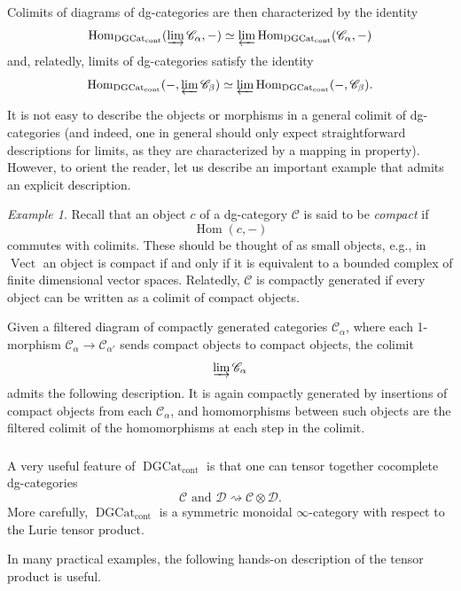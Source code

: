 \documentclass[10pt]{amsart}
\newcommand{\udHom}{\on{Hom}_{\DGCat}}
\newcommand{\on}{\operatorname}
\newcommand{\Vect}{\on{Vect}}
\theoremstyle{remark}
\newtheorem{ex}[subsubsection]{Example}
\newcommand{\Hom}{\operatorname{Hom}}
\newcommand{\sD}{\mathscr{D}}
\numberwithin{equation}{section}
\newcommand{\sC}{\mathscr{C}}
\newcommand{\msf}{\operatorname}
\newcommand{\DGCat}{\msf{DGCat}_{\on{cont}}}
\begin{document}
Colimits of diagrams of dg-categories are then characterized by the identity 
%
\[
\udHom(\varinjlim \sC_\alpha, -) \simeq \varprojlim 
\udHom(\sC_\alpha, -)
\]
%
and, relatedly, limits of dg-categories satisfy the identity 
%
\[
 \udHom(-, \varprojlim \sC_\beta) \simeq \varprojlim 
 \udHom(-, \sC_\beta).
\]
%

It is not easy to describe the objects or morphisms in a general colimit of 
dg-categories (and indeed, one in general should only expect straightforward 
descriptions for limits, as they are characterized by a mapping in 
property). However, to orient the reader, let us describe an important example 
that admits an explicit description. 


\begin{ex}\label{e:colimitcats}Recall that an object $c$ of a dg-category $\sC$ 
is said to be {\em 
compact} if $$\Hom(c, -)$$ commutes with colimits. These should be thought of 
as 
small objects, e.g., in $\Vect$ an object is compact if and only if it is 
equivalent to a bounded complex of finite dimensional vector spaces. Relatedly, 
$\sC$ is compactly generated if every object can be written as a colimit of 
compact objects. 

Given a filtered diagram of compactly generated categories $\sC_\alpha$, where 
each 1-morphism $\sC_\alpha \rightarrow \sC_{\alpha'}$ sends compact objects to 
compact objects, the colimit 
%
\[
  \varinjlim \sC_{\alpha}
\]
%
admits the following description. It is again compactly generated by insertions 
of compact objects from each $\sC_{\alpha}$, and homomorphisms between such 
objects are the filtered colimit of the homomorphisms at each step in the 
colimit. 
\end{ex}



\subsubsection{}A very useful feature of $\DGCat$ is that one can tensor together 
cocomplete dg-categories 
%
\[
   \sC \text{ and } \sD \rightsquigarrow \sC \otimes \sD. 
\]
%
More carefully, $\DGCat$ is a symmetric monoidal $\infty$-category with respect 
to the Lurie tensor product. 







In many practical examples, the following hands-on description of the tensor 
product is useful. 
\end{document}
